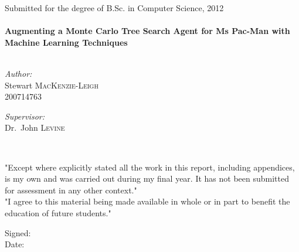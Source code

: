 \begin{titlepage}
\begin{center}


Submitted for the degree of B.Sc. in Computer Science, 2012\\[0.5cm]

\HRule \\[0.4cm]

{ \huge \bfseries Augmenting a Monte Carlo Tree Search Agent for Ms Pac-Man with Machine Learning Techniques}\\[0.4cm]

\HRule \\[1.5cm]

\begin{minipage}{0.4\textwidth}
\begin{flushleft} \large
\emph{Author:}\\
Stewart \textsc{MacKenzie-Leigh}\\
200714763
\end{flushleft}
\end{minipage}
\begin{minipage}{0.4\textwidth}
\begin{flushright} \large
\emph{Supervisor:} \\
Dr.~John \textsc{Levine}
\end{flushright}
\end{minipage} \\[2cm]

\end{center}

"Except where explicitly stated all the work in this report, including appendices, is my own and was carried out during my final year. It has not been submitted for assessment in any other context."\\

"I agree to this material being made available in whole or in part to benefit the education of future students." \\[0.5cm]

\begin{flushleft}
Signed: \\[0.5cm]
Date:
\end{flushleft}

\end{titlepage}